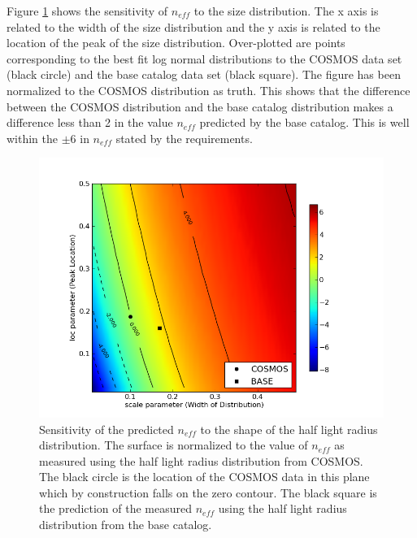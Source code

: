 \documentclass[]{article}
\begin{document}
{Figure \ref{fig:size_sens} shows the sensitivity of $n_{eff}$ to the size distribution.  The x axis is related to the width of the 
size distribution and the y axis is related to the location of the peak of the size distribution. Over-plotted are points corresponding
to the best fit log normal distributions to the COSMOS data set (black circle) and the base catalog data set (black square).  The figure has been
normalized to the COSMOS distribution as truth.  This shows that the difference between the COSMOS distribution and
the base catalog distribution makes a difference less than 2 in the value $n_{eff}$ predicted by the base catalog.  This is well within the $\pm6$ in $n_{eff}$ 
stated by the requirements.
\begin{figure}[H]
\centering
\includegraphics[width=5in]{validation_figures/size_sensitivity.png}
\caption{Sensitivity of the predicted $n_{eff}$ to the shape of the half light radius distribution.  
The surface is normalized to the value of $n_{eff}$ as measured using the half light radius distribution from COSMOS.  The black circle
is the location of the COSMOS data in this plane which by construction falls on the zero contour.  The black square is the prediction of
the measured $n_{eff}$ using the half light radius distribution from the base catalog.\label{fig:size_sens}}
\end{figure}


}
\end{document}
